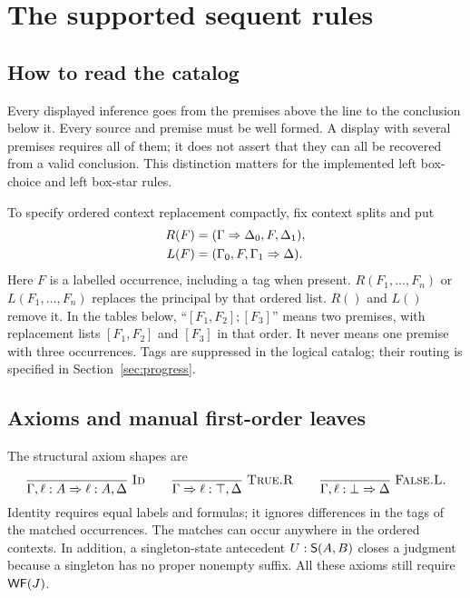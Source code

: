 \section{The supported sequent rules}\label{sec:rules}

\subsection{How to read the catalog}
Every displayed inference goes from the premises above the line to the
conclusion below it. Every source and premise must be well formed. A display
with several premises requires all of them; it does not assert that they
can all be recovered from a valid conclusion. This distinction matters for
the implemented left box-choice and left box-star rules.

To specify ordered context replacement compactly, fix context splits and put
\begin{align*}
 R(F)&=(\seq{\Gamma}{\Delta_0,F,\Delta_1}),\\
 L(F)&=(\seq{\Gamma_0,F,\Gamma_1}{\Delta}).
\end{align*}
Here $F$ is a labelled occurrence, including a tag when present.
$R(F_1,\ldots,F_n)$ or $L(F_1,\ldots,F_n)$ replaces the principal by that
ordered list. $R()$ and $L()$ remove it. In the tables below,
``$[F_1,F_2];[F_3]$'' means two premises, with replacement lists
$[F_1,F_2]$ and $[F_3]$ in that order. It never means one premise with three
occurrences. Tags are suppressed in the logical catalog; their routing is
specified in Section~\ref{sec:progress}.

\subsection{Axioms and manual first-order leaves}
The structural axiom shapes are
\[
 \Rule{Id}{}{\seq{\Gamma,\ann{\ell}{A}}{\ann{\ell}{A},\Delta}}
 \qquad
 \Rule{True.R}{}{\seq{\Gamma}{\ann{\ell}{\top},\Delta}}
 \qquad
 \Rule{False.L}{}{\seq{\Gamma,\ann{\ell}{\bot}}{\Delta}}.
\]
Identity requires equal labels and formulas; it ignores differences in the
tags of the matched occurrences. The matches can occur anywhere in the
ordered contexts. In addition, a singleton-state antecedent
$\ann{U}{\Suf{A}{B}}$ closes a judgment because a singleton has no proper
nonempty suffix. All these axioms still require $\WF(J)$.

